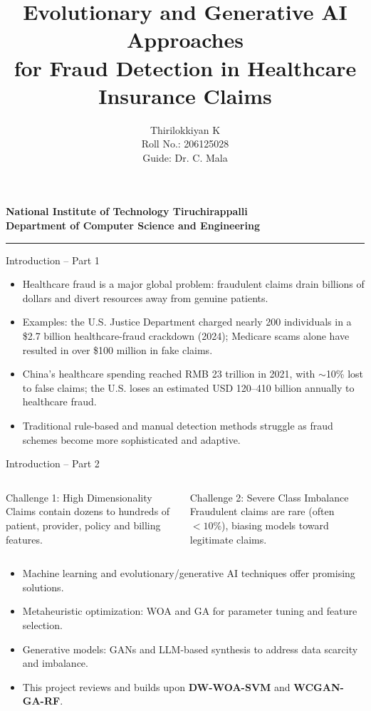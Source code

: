 \documentclass[aspectratio=169,11pt]{beamer}
\title{Evolutionary and Generative AI Approaches\\for Fraud Detection in Healthcare Insurance Claims}
\author{Thirilokkiyan K\\Roll No.: 206125028\\Guide: Dr. C. Mala}
\institute{M.Tech Project Work -- Phase 1}
\date{}
\newcommand{\NITHeader}{
\begin{center}
{\large\bfseries National Institute of Technology Tiruchirappalli}\\[-1mm]
{\normalsize\bfseries Department of Computer Science and Engineering}
\end{center}
\vspace{-2mm}\hrule\vspace{3mm}
}
\begin{document}
\begin{frame}
\NITHeader
\titlepage
\end{frame}

\begin{frame}{Introduction -- Part 1}
\begin{itemize}
\item Healthcare fraud is a major global problem: fraudulent claims drain billions of dollars and divert resources away from genuine patients.
\item Examples: the U.S. Justice Department charged nearly 200 individuals in a \$2.7 billion healthcare-fraud crackdown (2024); Medicare scams alone have resulted in over \$100 million in fake claims.
\item China's healthcare spending reached RMB 23 trillion in 2021, with $\sim$10\% lost to false claims; the U.S. loses an estimated USD 120--410 billion annually to healthcare fraud.
\item Traditional rule-based and manual detection methods struggle as fraud schemes become more sophisticated and adaptive.
\end{itemize}
\end{frame}

\begin{frame}{Introduction -- Part 2}
\begin{columns}[T]
\begin{block}{Challenge 1: High Dimensionality}
Claims contain dozens to hundreds of patient, provider, policy and billing features.
\end{block}
\begin{block}{Challenge 2: Severe Class Imbalance}
Fraudulent claims are rare (often $<10\%$), biasing models toward legitimate claims.
\end{block}
\end{columns}
\vspace{3mm}
\begin{itemize}
\item Machine learning and evolutionary/generative AI techniques offer promising solutions.
\item Metaheuristic optimization: WOA and GA for parameter tuning and feature selection.
\item Generative models: GANs and LLM-based synthesis to address data scarcity and imbalance.
\item This project reviews and builds upon \textbf{DW-WOA-SVM} and \textbf{WCGAN-GA-RF}.
\end{itemize}
\end{frame}
\end{document}
